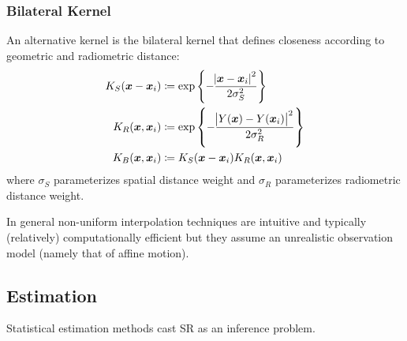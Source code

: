 \subsubsection{Bilateral Kernel}
An alternative kernel is the bilateral kernel\cite{Tomasi:1998:BFG:938978.939190} that defines closeness according to geometric and radiometric distance:
\begin{equation}
    \begin{split}
        K_S(\bm{x} - \bm{x}_i) &\coloneqq \exp \left\{ -\frac{\abs{ \bm{x} - \bm{x}_i }^2}{2 \sigma_S^2}  \right\} \\
        K_R(\bm{x}, \bm{x}_i) &\coloneqq \exp \left\{ -  \frac{\abs{ Y(\bm{x}) - Y(\bm{x}_i) }^2}{2 \sigma_R^2} \right\} \\
        K_B(\bm{x}, \bm{x}_i) &\coloneqq K_S(\bm{x} - \bm{x}_i)K_R(\bm{x}, \bm{x}_i)
    \end{split}
    \label{eqn:bilateralkernel}
\end{equation}
where \(\sigma_S\) parameterizes spatial distance weight and \(\sigma_R\) parameterizes radiometric distance weight.

In general non-uniform interpolation techniques are intuitive and typically (relatively) computationally efficient but they assume an unrealistic observation model (namely that of affine motion).

\subsection{Estimation}\label{subsec:estimation}

Statistical estimation methods cast SR as an inference problem.
%
